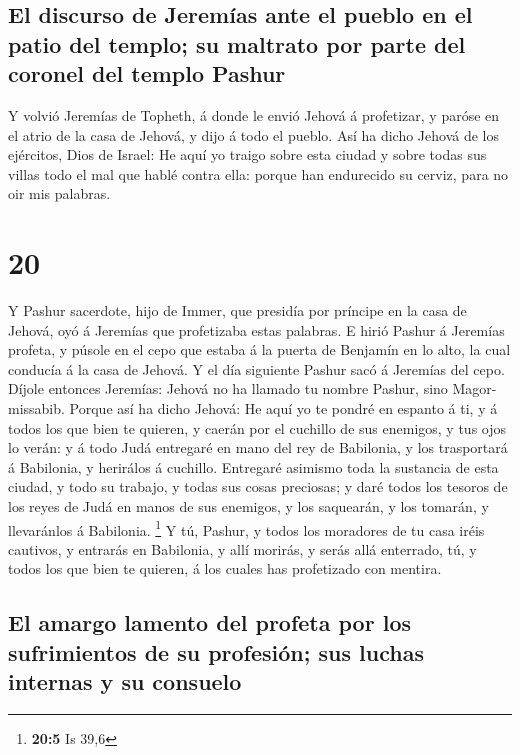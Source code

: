 \hypertarget{el-discurso-de-jeremuxedas-ante-el-pueblo-en-el-patio-del-templo-su-maltrato-por-parte-del-coronel-del-templo-pashur}{%
\subsection{El discurso de Jeremías ante el pueblo en el patio del
templo; su maltrato por parte del coronel del templo
Pashur}\label{el-discurso-de-jeremuxedas-ante-el-pueblo-en-el-patio-del-templo-su-maltrato-por-parte-del-coronel-del-templo-pashur}}

 Y volvió Jeremías de Topheth, á donde le envió Jehová á
profetizar, y paróse en el atrio de la casa de Jehová, y dijo á todo el
pueblo.  Así ha dicho Jehová de los ejércitos, Dios de
Israel: He aquí yo traigo sobre esta ciudad y sobre todas sus villas
todo el mal que hablé contra ella: porque han endurecido su cerviz, para
no oir mis palabras.

\hypertarget{section-19}{%
\section{20}\label{section-19}}

 Y Pashur sacerdote, hijo de Immer, que presidía por
príncipe en la casa de Jehová, oyó á Jeremías que profetizaba estas
palabras.  E hirió Pashur á Jeremías profeta, y púsole en
el cepo que estaba á la puerta de Benjamín en lo alto, la cual conducía
á la casa de Jehová.  Y el día siguiente Pashur sacó á
Jeremías del cepo. Díjole entonces Jeremías: Jehová no ha llamado tu
nombre Pashur, sino Magor-missabib.  Porque así ha dicho
Jehová: He aquí yo te pondré en espanto á ti, y á todos los que bien te
quieren, y caerán por el cuchillo de sus enemigos, y tus ojos lo verán:
y á todo Judá entregaré en mano del rey de Babilonia, y los trasportará
á Babilonia, y herirálos á cuchillo.  Entregaré asimismo
toda la sustancia de esta ciudad, y todo su trabajo, y todas sus cosas
preciosas; y daré todos los tesoros de los reyes de Judá en manos de sus
enemigos, y los saquearán, y los tomarán, y llevaránlos á Babilonia.
\footnote{\textbf{20:5} Is 39,6}  Y tú, Pashur, y todos
los moradores de tu casa iréis cautivos, y entrarás en Babilonia, y allí
morirás, y serás allá enterrado, tú, y todos los que bien te quieren, á
los cuales has profetizado con mentira.

\hypertarget{el-amargo-lamento-del-profeta-por-los-sufrimientos-de-su-profesiuxf3n-sus-luchas-internas-y-su-consuelo}{%
\subsection{El amargo lamento del profeta por los sufrimientos de su
profesión; sus luchas internas y su
consuelo}\label{el-amargo-lamento-del-profeta-por-los-sufrimientos-de-su-profesiuxf3n-sus-luchas-internas-y-su-consuelo}}

